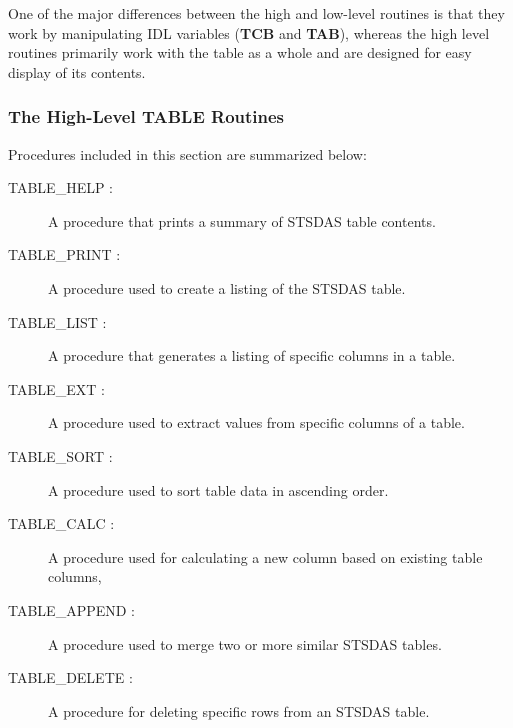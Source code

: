 One of the major differences between the high and low-level routines is that
they work by manipulating IDL variables ({\bf TCB} and 
{\bf TAB}), whereas the high level routines primarily work with the table as 
a whole and are designed for easy display of its contents.\\


\subsubsection{\bf The High-Level TABLE Routines}
\label{sdas table high}
Procedures 
included in this section are summarized below:

\begin{description}
\item [TABLE\_HELP :] A procedure that prints a summary of STSDAS table 
contents.
\item [TABLE\_PRINT :] A procedure used to create a listing of the STSDAS table.
\item [TABLE\_LIST :] A procedure that generates a listing of specific 
columns in a table.
\item [TABLE\_EXT :] A procedure used to extract values from specific columns 
of a table.
\item [TABLE\_SORT :] A procedure used to sort table data in ascending order.
\item [TABLE\_CALC  :] A procedure used for calculating a new column based 
on existing table columns,
\item [TABLE\_APPEND :] A procedure used to merge two or more similar STSDAS 
tables.
\item [TABLE\_DELETE :] A procedure for deleting specific rows from an STSDAS 
table.
\end{description}

\vspace{0.25in}


